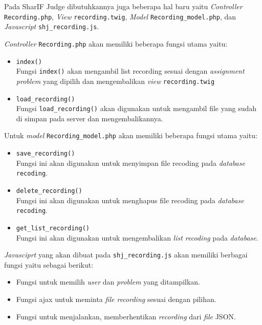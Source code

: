 \documentclass[a4paper,twoside]{article}
\begin{document}
\begin{enumerate}
	      Pada SharIF Judge dibutuhkannya juga beberapa hal baru yaitu \textit{Controller} \verb|Recording.php|, \textit{View} \verb|recording.twig|, \textit{Model} \verb|Recording_model.php|, dan \textit{Javascript} \verb|shj_recording.js|.

	      \vspace{0.15cm}
	      \textit{Controller} \verb|Recording.php| akan memiliki beberapa fungsi utama yaitu:
	      \begin{itemize}
		      \item \verb|index()| \\
		            Fungsi \verb|index()| akan mengambil list recording sesuai dengan \textit{assignment} \textit{problem} yang dipilih dan mengembalikan \textit{view} \verb|recording.twig|
		      \item \verb|load_recording()| \\
		            Fungsi \verb|load_recording()| akan digunakan untuk mengambil file yang sudah di simpan pada server dan mengembalikannya.
	      \end{itemize}

	      \vspace{0.15cm}
	      Untuk \textit{model} \verb|Recording_model.php| akan memiliki beberapa fungsi utama yaitu:
	      \begin{itemize}
		      \item \verb|save_recording()| \\
		            Fungsi ini akan digunakan untuk menyimpan file recoding pada \textit{database} \verb|recoding|.
		      \item \verb|delete_recording()| \\
		            Fungsi ini akan digunakan untuk menghapus file recoding pada \textit{database} \verb|recoding|.
		      \item \verb|get_list_recording()| \\
		            Fungsi ini akan digunakan untuk mengembalikan \textit{list recoding} pada \textit{database}.
	      \end{itemize}

	      \vspace{0.15cm}
	      \textit{Javasciprt} yang akan dibuat pada \verb|shj_recording.js| akan memiliki berbagai fungsi yaitu sebagai berikut:

	      \begin{itemize}
		      \item Fungsi untuk memilih \textit{user} dan \textit{problem} yang ditampilkan.
		      \item Fungsi ajax untuk meminta \textit{file recording} sesuai dengan pilihan.
		      \item Fungsi untuk menjalankan, memberhentikan \textit{recording} dari \textit{file} JSON.
	      \end{itemize}


\end{enumerate}
\end{document}
